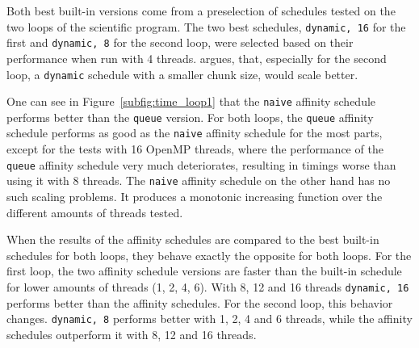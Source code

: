 \documentclass[twoside,11pt]{article}
\begin{document}
Both best built-in versions come from a preselection of
schedules tested on the two loops of the scientific
program.
The two best schedules, \texttt{dynamic, 16} for the first
and \texttt{dynamic, 8} for the second loop, were selected
based on their performance when run with 4 threads.
\citet{b1} argues, that, especially for the second loop,
a \texttt{dynamic} schedule with a smaller chunk size,
would scale better.

One can see in Figure~\ref{subfig:time_loop1} that the
\texttt{naive} affinity schedule performs better than the
\texttt{queue} version.
For both loops, the \texttt{queue} affinity schedule
performs as good as the \texttt{naive} affinity schedule
for the most parts, except for the tests with 16 OpenMP
threads, where the performance of the \texttt{queue}
affinity schedule very much deteriorates, resulting in
timings worse than using it with 8 threads.
The \texttt{naive} affinity schedule on the other hand
has no such scaling problems.
It produces a monotonic increasing function over the
different amounts of threads tested.

When the results of the affinity schedules are compared to
the best built-in schedules for both loops, they behave
exactly the opposite for both loops.
For the first loop, the two affinity schedule versions are
faster than the built-in schedule for lower amounts of
threads (1, 2, 4, 6).
With 8, 12 and 16 threads \texttt{dynamic, 16} performs
better than the affinity schedules.
For the second loop, this behavior changes.
\texttt{dynamic, 8} performs better with 1, 2, 4 and 6
threads, while the affinity schedules outperform it with
8, 12 and 16 threads.
\end{document}
